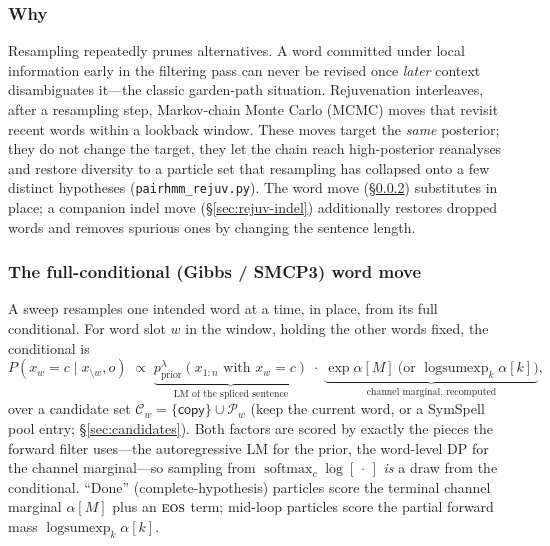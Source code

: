\documentclass[11pt]{article}
\providecommand{\given}{\mid}
\providecommand{\eos}{\textsc{eos}}
\providecommand{\copyact}{\textsf{copy}}
\providecommand{\lse}{\operatorname{logsumexp}}
\providecommand{\softmax}{\operatorname{softmax}}
\providecommand{\code}[1]{\texttt{#1}}
\begin{document}
\subsubsection{Why}
Resampling repeatedly prunes alternatives. A word committed under local information early in the filtering pass can never be revised once \emph{later} context disambiguates it---the classic garden-path situation. Rejuvenation interleaves, after a resampling step, Markov-chain Monte Carlo (MCMC) moves that revisit recent words within a lookback window. These moves target the \emph{same} posterior; they do not change the target, they let the chain reach high-posterior reanalyses and restore diversity to a particle set that resampling has collapsed onto a few distinct hypotheses (\code{pairhmm\_rejuv.py}). The word move (\S\ref{sec:rejuv-move}) substitutes in place; a companion indel move (\S\ref{sec:rejuv-indel}) additionally restores dropped words and removes spurious ones by changing the sentence length.

\subsubsection{The full-conditional (Gibbs / SMCP3) word move}
\label{sec:rejuv-move}

A sweep resamples one intended word at a time, in place, from its full conditional. For word slot $w$ in the window, holding the other words fixed, the conditional is
\begin{equation}\label{eq:full-cond}
  P(x_w = c \given x_{\setminus w}, o)
  \;\propto\; \underbrace{p_{\mathrm{prior}}^{\lambda}(x_{1:n}\text{ with } x_w{=}c)}_{\text{LM of the spliced sentence}}
              \;\cdot\; \underbrace{\exp\alpha[M]\ \text{(or }\lse_k\alpha[k])}_{\text{channel marginal, recomputed}},
\end{equation}
over a candidate set $\mathcal C_w = \{\copyact\}\cup \mathcal P_w$ (keep the current word, or a SymSpell pool entry; \S\ref{sec:candidates}). Both factors are scored by exactly the pieces the forward filter uses---the autoregressive LM for the prior, the word-level DP for the channel marginal---so sampling from $\softmax_{c} \log[\,\cdot\,]$ \emph{is} a draw from the conditional. ``Done'' (complete-hypothesis) particles score the terminal channel marginal $\alpha[M]$ plus an $\eos$ term; mid-loop particles score the partial forward mass $\lse_k\alpha[k]$.
\end{document}
